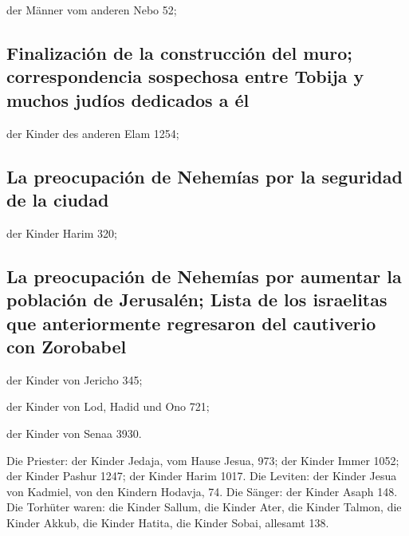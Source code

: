  der Männer vom anderen Nebo 52;

\hypertarget{finalizaciuxf3n-de-la-construcciuxf3n-del-muro-correspondencia-sospechosa-entre-tobija-y-muchos-juduxedos-dedicados-a-uxe9l}{%
\subsection{Finalización de la construcción del muro; correspondencia
sospechosa entre Tobija y muchos judíos dedicados a
él}\label{finalizaciuxf3n-de-la-construcciuxf3n-del-muro-correspondencia-sospechosa-entre-tobija-y-muchos-juduxedos-dedicados-a-uxe9l}}

 der Kinder des anderen Elam 1254;

\hypertarget{la-preocupaciuxf3n-de-nehemuxedas-por-la-seguridad-de-la-ciudad}{%
\subsection{La preocupación de Nehemías por la seguridad de la
ciudad}\label{la-preocupaciuxf3n-de-nehemuxedas-por-la-seguridad-de-la-ciudad}}

 der Kinder Harim 320;

\hypertarget{la-preocupaciuxf3n-de-nehemuxedas-por-aumentar-la-poblaciuxf3n-de-jerusaluxe9n-lista-de-los-israelitas-que-anteriormente-regresaron-del-cautiverio-con-zorobabel}{%
\subsection{La preocupación de Nehemías por aumentar la población de
Jerusalén; Lista de los israelitas que anteriormente regresaron del
cautiverio con
Zorobabel}\label{la-preocupaciuxf3n-de-nehemuxedas-por-aumentar-la-poblaciuxf3n-de-jerusaluxe9n-lista-de-los-israelitas-que-anteriormente-regresaron-del-cautiverio-con-zorobabel}}

 der Kinder von Jericho 345;

 der Kinder von Lod, Hadid und Ono 721;

 der Kinder von Senaa 3930.

 Die Priester: der Kinder Jedaja, vom Hause Jesua, 973;
 der Kinder Immer 1052;  der Kinder Pashur
1247;  der Kinder Harim 1017.  Die
Leviten: der Kinder Jesua von Kadmiel, von den Kindern Hodavja, 74.
 Die Sänger: der Kinder Asaph 148.  Die
Torhüter waren: die Kinder Sallum, die Kinder Ater, die Kinder Talmon,
die Kinder Akkub, die Kinder Hatita, die Kinder Sobai, allesamt 138.

